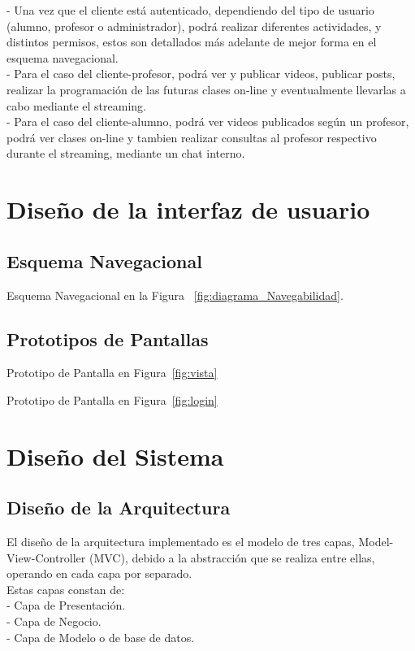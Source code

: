 \documentclass[12pt]{article}
\begin{document}
-	Una vez que el cliente está autenticado, dependiendo del tipo de usuario (alumno, profesor o 
administrador), podrá realizar diferentes actividades, y distintos permisos, estos son detallados
más adelante de mejor forma en el esquema navegacional.\\

-	Para el caso del cliente-profesor, podrá ver y publicar videos, publicar posts, realizar la programación 
de las futuras clases on-line y eventualmente llevarlas a cabo mediante el streaming.\\

-	Para el caso del cliente-alumno, podrá ver videos publicados según un profesor,
podrá ver clases on-line y tambien realizar consultas al profesor respectivo durante el 
streaming, mediante un chat interno.

\newpage
\section{Dise\~no de la interfaz de usuario}
\subsection{Esquema Navegacional}
Esquema Navegacional en la Figura ~\ref{fig:diagrama_Navegabilidad}.

\subsection{Prototipos de Pantallas}
Prototipo de Pantalla en Figura~\ref{fig:vista}

Prototipo de Pantalla en Figura~\ref{fig:login}

\newpage
\section{Dise\~no del Sistema}
\subsection{Dise\~no de la Arquitectura}
El dise\~no de la arquitectura implementado es el modelo de tres capas, Model-View-Controller (MVC), debido a la abstracción que se realiza entre ellas, operando en cada capa por separado.\\
Estas capas constan de:\\
-	Capa de Presentación.\\
-	Capa de Negocio.\\
-	Capa de Modelo o de base de datos.\\
\end{document}
